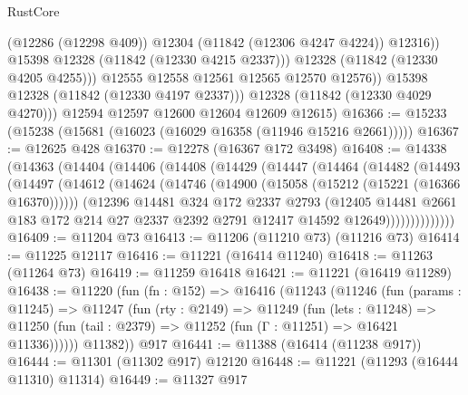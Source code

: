 \begin{lexlean}{RustCore}
\begin{coremodule}
                      (@12286 (@12298 @409))
                      @12304
                      (@11842 (@12306 @4247 @4224))
                      @12316))
                  @15398
                  @12328
                  (@11842 (@12330 @4215 @2337)))
                @12328
                (@11842 (@12330 @4205 @4255)))
              @12555
              @12558
              @12561
              @12565
              @12570
              @12576))
          @15398
          @12328
          (@11842 (@12330 @4197 @2337)))
        @12328
        (@11842 (@12330 @4029 @4270)))
      @12594
      @12597
      @12600
      @12604
      @12609
      @12615)
@16366 := @15233 (@15238 (@15681 (@16023 (@16029 @16358 (@11946 @15216 @2661)))))
@16367 := @12625 @428
@16370 := @12278 (@16367 @172 @3498)
@16408 := @14338
    (@14363
      (@14404
        (@14406
          (@14408
            (@14429
              (@14447
                (@14464
                  (@14482
                    (@14493
                      (@14497
                        (@14612
                          (@14624
                            (@14746 (@14900 (@15058 (@15212 (@15221 (@16366 @16370))))))
                            (@12396
                              @14481
                              @324
                              @172
                              @2337
                              @2793
                              (@12405
                                @14481
                                @2661
                                @183
                                @172
                                @214
                                @27
                                @2337
                                @2392
                                @2791
                                @12417
                                @14592
                                @12649))))))))))))))
@16409 := @11204 @73
@16413 := @11206 (@11210 @73) (@11216 @73)
@16414 := @11225 @12117
@16416 := @11221 (@16414 @11240)
@16418 := @11263 (@11264 @73)
@16419 := @11259 @16418
@16421 := @11221 (@16419 @11289)
@16438 := @11220
    (fun (fn : @152) =>
    @16416
      (@11243
        (@11246
          (fun (params : @11245) =>
          @11247
            (fun (rty : @2149) =>
            @11249
              (fun (lets : @11248) =>
              @11250 (fun (tail : @2379) => @11252 (fun (Γ : @11251) => @16421 @11336))))))
        @11382))
    @917
@16441 := @11388 (@16414 (@11238 @917))
@16444 := @11301 (@11302 @917) @12120
@16448 := @11221 (@11293 (@16444 @11310) @11314)
@16449 := @11327 @917

\end{coremodule}
\end{lexlean}
